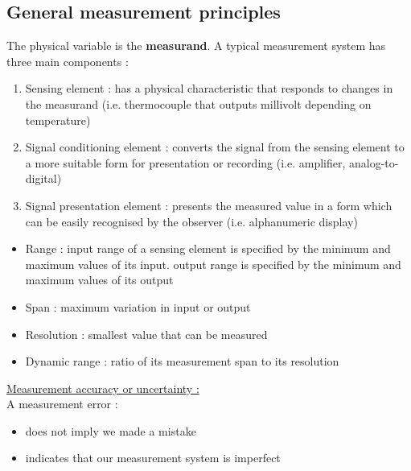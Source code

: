 \documentclass[../main.tex]{subfiles}
\begin{document}
\localtableofcontents

\subsection{General measurement principles}
The physical variable is the \textbf{measurand}. A typical measurement system has three main components : \begin{enumerate}
    \item Sensing element : has a physical characteristic that responds to changes in the measurand (i.e. thermocouple that outputs millivolt depending on temperature)\\
    \item Signal conditioning element : converts the signal from the sensing element to a more suitable form for presentation or recording (i.e. amplifier, analog-to-digital)\\
    \item Signal presentation element : presents the measured value in a form which can be easily recognised by the observer (i.e. alphanumeric display)\\
\end{enumerate}

\begin{itemize}
    \item Range : input range of a sensing element is specified by the minimum and maximum values of its input. output range is specified by the minimum and maximum values of its output\\
    \item Span : maximum variation in input or output\\
    \item Resolution : smallest value that can be measured\\
    \item Dynamic range : ratio of its measurement span to its resolution\\
\end{itemize}

\quad \underline{Measurement accuracy or uncertainty :}\\

A measurement error : 
\begin{itemize}
    \item does not imply we made a mistake\\
    \item indicates that our measurement system is imperfect\\
\end{itemize}
\end{document}
